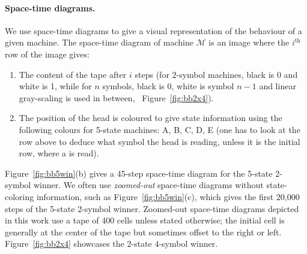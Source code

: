 \vspace{-1ex}
\paragraph*{Space-time diagrams.} We use space-time diagrams to give a visual representation of the behaviour of a given machine. The space-time diagram of machine $\mathcal{M}$ is an image where the $i^\text{th}$ row of the image gives:
\begin{enumerate}
    \item The content of the tape after $i$ steps (for 2-symbol machines, black is 0 and white is 1, while for $n$ symbols, black is 0, white is symbol $n-1$ and linear gray-scaling is used in between, \eg~Figure~\ref{fig:bb2x4}).
    \item The position of the head is coloured to give state information using the following colours for 5-state machines: \textcolor{colorA}{A},  \textcolor{colorB}{B},  \textcolor{colorC}{C},  \textcolor{colorD}{D},  \textcolor{colorE}{E} (one has to look at the row above to deduce what symbol the head is reading, unless it is the initial row, where a \szero is read).
\end{enumerate}

Figure~\ref{fig:bb5win}(b) gives a 45-step space-time diagram for the 5-state 2-symbol \BBfull winner. We often use \textit{zoomed-out} space-time diagrams without state-coloring information, such as Figure~\ref{fig:bb5win}(c), which gives the first 20,000 steps of the 5-state 2-symbol \BBfull winner. Zoomed-out space-time diagrams depicted in this work use a tape of 400 cells unless stated otherwise; the initial cell is generally at the center of the tape but sometimes offset to the right or left. Figure~\ref{fig:bb2x4} showcases the 2-state 4-symbol \BBfull winner.


